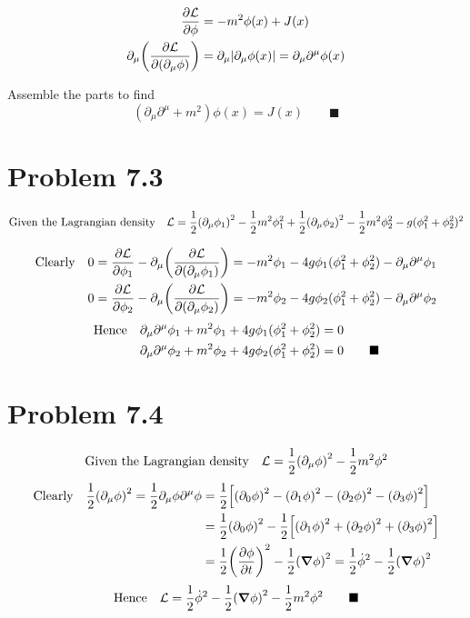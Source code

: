 \documentclass{article}
\begin{document}
\begin{align*}
\pdv{\mathcal{L}}{\phi}&=-m^2 \phi(x)+J(x)\\
\partial_{\mu} \qty(\pdv{\mathcal{L}}{\qty(\partial_{\mu}\phi)})&=\partial_{\mu}\qty|\partial_{\mu}\phi(x)|=\partial_{\mu}\partial^{\mu}\phi(x)
\end{align*}

Assemble the parts to find
\[(\partial_{\mu}\partial^{\mu}+m^2)\phi(x)=J(x)\qquad\blacksquare
\]

\section*{Problem 7.3}



\[ \qq*{Given the Lagrangian density} \mathcal{L}=\frac{1}{2}\qty(\partial_{\mu}\phi_1)^2-\frac{1}{2}m^2\phi_1^2+\frac{1}{2}\qty(\partial_{\mu}\phi_2)^2-\frac{1}{2}m^2\phi_2^2-g(\phi_1^2+\phi_2^2)^2\]


\begin{align*}
\qq*{Clearly}0=\pdv{\mathcal{L}}{\phi_1}-\partial_{\mu} \qty(\pdv{\mathcal{L}}{\qty(\partial_{\mu}\phi_1)})&=-m^2 \phi_1-4g\phi_1 (\phi_1^2+\phi_2^2)-\partial_{\mu}\partial^{\mu}\phi_1\\
0=\pdv{\mathcal{L}}{\phi_2}-\partial_{\mu} \qty(\pdv{\mathcal{L}}{\qty(\partial_{\mu}\phi_2)})&=-m^2 \phi_2-4g\phi_2 (\phi_1^2+\phi_2^2)-\partial_{\mu}\partial^{\mu}\phi_2
\end{align*}
\begin{align*}
\qq*{Hence}\partial_{\mu}\partial^{\mu}\phi_1+m^2 \phi_1+4g\phi_1 (\phi_1^2+\phi_2^2)&=0\\
\partial_{\mu}\partial^{\mu}\phi_2+m^2 \phi_2+4g\phi_2 (\phi_1^2+\phi_2^2)&=0\qquad\blacksquare
\end{align*}


\section*{Problem 7.4}



\[ \qq*{Given the Lagrangian density} \mathcal{L}=\frac{1}{2}\qty(\partial_{\mu}\phi)^2-\frac{1}{2}m^2\phi^2\]
\begin{align*}
\qq*{Clearly}\frac{1}{2}\qty(\partial_{\mu}\phi)^2=\frac{1}{2}\partial_{\mu}\phi\partial^{\mu}\phi&=\frac{1}{2}\qty[\qty(\partial_{0}\phi)^2-\qty(\partial_{1}\phi)^2-\qty(\partial_{2}\phi)^2-\qty(\partial_{3}\phi)^2]\\
&=\frac{1}{2}\qty(\partial_{0}\phi)^2-\frac{1}{2}\qty[\qty(\partial_{1}\phi)^2+\qty(\partial_{2}\phi)^2+\qty(\partial_{3}\phi)^2]\\
&=\frac{1}{2}\qty(\pdv{\phi}{t})^2-\frac{1}{2}\qty(\grad \phi)^2=\frac{1}{2}\dot{\phi}^2-\frac{1}{2}\qty(\grad \phi)^2
\end{align*}
\[ \qq*{Hence} \mathcal{L}=\frac{1}{2}\dot{\phi}^2-\frac{1}{2}\qty(\grad \phi)^2-\frac{1}{2}m^2\phi^2\qquad\blacksquare\]
\end{document}
